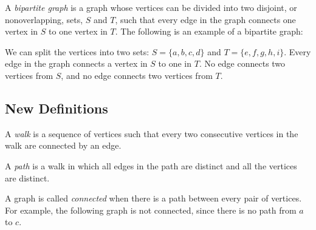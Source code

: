 \documentclass[11pt]{article}
\begin{document}
\begin{definition}
\label{def:bipartite}
A \textit{bipartite graph} is a graph whose vertices can be divided into two disjoint, or nonoverlapping, sets, $S$ and $T$, such that every
edge in the graph connects one vertex in $S$ to one vertex in $T$. The following is an example of a bipartite graph:
\begin{center}
\end{center}
We can split the vertices into two sets: $S=\{a,b,c,d\}$ and $T=\{e,f,g,h,i\}$. Every edge in the graph connects a vertex in $S$ to
one in $T$. No edge connects two vertices from $S$, and no edge connects two vertices from $T$.
\end{definition}

\subsection{New Definitions}

\begin{definition}
\label{def:walk}
A \textit{walk} is a sequence of vertices such that every two consecutive vertices in the walk are connected by an edge.
\end{definition}

\begin{definition}
\label{def:path}
A \textit{path} is a walk in which all edges in the path are distinct and all the vertices are distinct.
\end{definition}

\begin{definition}
\label{def:connected}
A graph is called \textit{connected} when there is a path between every pair of vertices. For example, the following graph is not connected,
since there is no path from $a$ to $c$.
\begin{center}
\end{center}
\end{definition}
\end{document}
